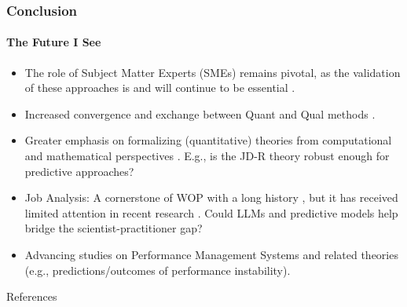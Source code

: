 \documentclass{beamer}
\begin{document}
\begin{frame}
	\frametitle{Conclusion}
	\framesubtitle{The Future I See}
	{\small
		\begin{itemize}
			\item<1> The role of Subject Matter Experts (SMEs) remains pivotal, as the validation of these approaches is and will continue to be essential {\scriptsize \parencite{woo2024}}.
			\item<2> Increased convergence and exchange between Quant and Qual methods {\scriptsize \parencite[see][]{bliese2024_AOM}}.
			\item<3> Greater emphasis on formalizing (quantitative) theories from computational and mathematical perspectives {\scriptsize \parencite{bliese2024_AOM, grand_inPressORM, vanDongen_inPress_PsychReview}}. E.g., is the JD-R theory robust enough for predictive approaches?
			\item<4> Job Analysis: A cornerstone of WOP with a long history {\scriptsize \parencite{viteles1922}}, but it has received limited attention in recent research {\scriptsize \parencite{li2024jobAnalysis, putka2023evaluating}}. Could LLMs and predictive models help bridge the scientist-practitioner gap?
			\item<5> Advancing studies on Performance Management Systems and related theories (e.g., predictions/outcomes of performance instability).
		\end{itemize}
	}
\end{frame}



\begin{frame}[allowframebreaks]{References}
    \printbibliography
\end{frame}


\end{document}
